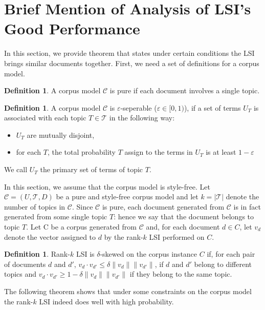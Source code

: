 \documentclass[a4paper,11pt,DIV=15]{scrartcl} %
\renewcommand{\epsilon}{\varepsilon}
\theoremstyle{plain}
\theoremstyle{definition}
\newtheorem{definition}[theorem]{Definition}
\begin{document}
\section{Brief Mention of Analysis of LSI's Good Performance} %
In this section, we provide theorem that states under certain conditions the LSI brings similar documents together.
First, we need a set of definitions for a corpus model.
\begin{definition}
  A corpus model $\mathscr{C}$ is pure if each document involves a single topic.
\end{definition}

\begin{definition}
  A corpus model $\mathscr{C}$ is $\epsilon$-seperable ($\epsilon \in [0,1)$), if a set of terms $U_T$ is associated with each topic $T \in \mathscr{T}$ in the following way:
\begin{itemize}
    \item $U_T$ are mutually disjoint,
    \item for each $T$, the total probability $T$ assign to the terms in $U_T$  is at least $1-\epsilon$
\end{itemize}
We call $U_T$ the primary set of terms of topic $T$.
\end{definition}

In this section, we assume that the corpus model is style-free.
Let $\mathscr{C} = (U,\mathscr{T}, D)$ be a pure and style-free corpus model and let $k = |\mathscr{T}|$ denote the number of topics in $\mathscr{C}$. Since $\mathscr{C}$ is pure, each document generated from $\mathscr{C}$ is in fact generated from some single topic $T$: hence we say that the document belongs to topic $T$.
Let C be a corpus generated from $\mathscr{C}$ and, for each document $d \in C$, let $v_d$ denote the vector assigned to $d$ by the rank-$k$ LSI performed on $C$.



\begin{definition}
    Rank-$k$ LSI is $\delta$-skewed on the corpus instance $C$ if, for each pair of documents $d$ and $d'$, $v_d \cdot v_{d'} \leq \delta \lVert v_d \rVert \lVert v_{d'}\rVert$,  if $d$ and $d'$ belong to different topics and $v_d \cdot v_{d'} \geq 1 - \delta  \lVert v_d \rVert \lVert v_{d'}\rVert$  if they belong to the same topic.
\end{definition}
The following theorem shows that under some constraints on the corpus model the rank-$k$ LSI indeed does well with high probability.
\end{document}
